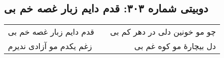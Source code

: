 \begin{center}
\section*{دوبیتی شماره ۳۰۳: قدم دایم زبار غصه خم بی}
\label{sec:303}
\begin{longtable}{l p{0.5cm} r}
قدم دایم زبار غصه خم بی
&&
چو مو خونین دلی در دهر کم بی
\\
زغم یکدم مو آزادی ندیرم
&&
دل بیچارهٔ مو کوه غم بی
\\
\end{longtable}
\end{center}
